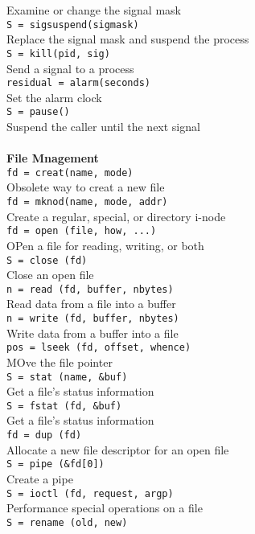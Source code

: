 \documentclass{book}
\newcommand {\kw}  [1] {\textbf{#1}}
\newcommand {\cmd} [1] {\texttt{#1}}
\begin{document}
Examine or change the signal mask
\\
\cmd{S = sigsuspend(sigmask)}\\
Replace the signal mask and suspend the process
\\
\cmd{S = kill(pid, sig)}\\
Send a signal to a process
\\
\cmd{residual = alarm(seconds)}\\
Set the alarm clock
\\
\cmd{S = pause()}\\
Suspend the caller until the next signal
\\
\\
\kw{File Mnagement}\\
\cmd{fd = creat(name, mode)}\\
Obsolete way to creat a new file
\\
\cmd{fd = mknod(name, mode, addr)}\\
Create a regular, special, or directory i-node
\\
\cmd{fd = open (file, how, ...)}\\
OPen a file for reading, writing, or both
\\
\cmd{S = close (fd)}\\
Close an open file
\\
\cmd{n = read (fd, buffer, nbytes)}\\
Read data from a file into a buffer
\\
\cmd{n = write (fd, buffer, nbytes)}\\
Write data from a buffer into a file
\\
\cmd{pos = lseek (fd, offset, whence)}\\
MOve the file pointer
\\
\cmd{S = stat (name, \&buf)}\\
Get a file's status information
\\
\cmd{S = fstat (fd, \&buf)}\\
Get a file's status information
\\
\cmd{fd = dup (fd)}\\
Allocate a new file descriptor for an open file
\\
\cmd{S = pipe (\&fd[0])}\\
Create a pipe
\\
\cmd{S = ioctl (fd, request, argp)}\\
Performance special operations on a file
\\
\cmd{S = rename (old, new)}\\
\end{document}
